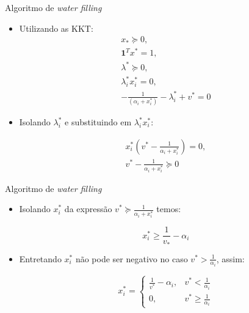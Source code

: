 \begin{frame}{Algoritmo de \textit{water filling}}
  
  \begin{itemize}
    \item Utilizando as KKT:
    \begin{subequations}
      \begin{align}		
      x_{*} \succeq 0, \\
      \textbf{1}^{T}x^{*} = 1, \\
      \lambda^{*} \succeq 0,\\
      \lambda^{*}_{i}x^{*}_{i} = 0, \\
      - \frac{1}{(\alpha_{i}+x^{*}_{i})} - \lambda^{*}_{i} + v^{*} = 0
      \end{align}
    \end{subequations}
    
    \item Isolando $\lambda^{*}_{i}$ e substituindo em $\lambda^{*}_{i}x^{*}_{i}$:
    
    \begin{subequations}
      \begin{align}		
      x^{*}_{i}( v^{*} - \frac{1}{\alpha_{i} + x^{*}_{i}}) = 0, \\
      v^{*} - \frac{1}{\alpha_{i} + x^{*}_{i}} \succeq 0
      \end{align}
    \end{subequations}
    
    
  \end{itemize}
\end{frame}

\begin{frame}{Algoritmo de \textit{water filling}}
  
  \begin{itemize}
    \item Isolando $x^{*}_{i}$ da expressão $v^{*} \succeq  \frac{1}{\alpha_{i} + x^{*}_{i}}$ temos:
    
    \begin{equation}
    x^{*}_{i} \geq \frac{1}{v_{*}} - \alpha_{i} 
    \end{equation}
    
    
    \item Entretando $x^{*}_{i}$ não pode ser negativo no caso $ v^{*} > \frac{1}{\alpha_{i}}$, assim:
    
    \begin{equation}\label{eq_vec_orthonormal}
    x^{*}_{i} = \begin{cases}
    \frac{1}{v^{*}} - \alpha_{i}, & v^{*} < \frac{1}{\alpha_{i}} \\
    0, & v^{*} \geq \frac{1}{\alpha_{i}}
    \end{cases}
    \end{equation}
    
  \end{itemize}
\end{frame}

